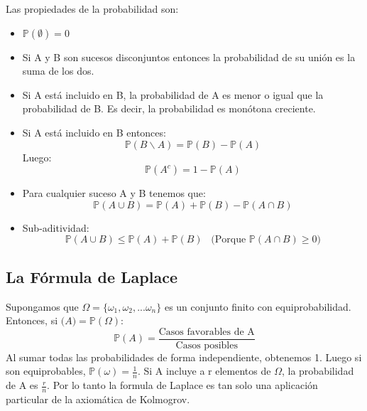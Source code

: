 \documentclass[11pt]{article}
\newcommand{\prob}{\mathbb{P}}
\theoremstyle{plain}
\begin{document}
                Las propiedades de la probabilidad son:
                \begin{itemize}
                    \item $\prob(\emptyset) = 0$
                    \item Si A y B son sucesos disconjuntos entonces la probabilidad de su unión es la suma de los dos.
                    \item Si A está incluido en B, la probabilidad de A es menor o igual que la probabilidad de B. Es decir, la probabilidad es monótona creciente.
                    \item Si A está incluido en B entonces:
                    \begin{equation}
                         \mathbb{P}(B \backslash A) = \mathbb{P}(B) - \mathbb{P}(A)
                     \end{equation}
                     Luego:
                     \begin{equation}\label{eq:8}
                         \mathbb{P}(A^c) = 1 - \mathbb{P}(A)
                     \end{equation}
                    \item Para cualquier suceso A y B tenemos que:
                    \begin{equation}
                         \mathbb{P}(A \cup B) = \mathbb{P}(A) + \mathbb{P}(B) - \mathbb{P} (A \cap B)
                    \end{equation}
                    \item Sub-aditividad:
                    \begin{equation}
                        \mathbb{P}(A \cup B) \le \mathbb{P}(A) + \mathbb{P}(B) \;\;\; \text{(Porque $\mathbb{P}(A\cap B) \ge 0$)}
                    \end{equation}
                \end{itemize}
            \subsection{La Fórmula de Laplace} %
            \label{sub:la_fórmula_de_laplace}
                Supongamos que $\varOmega = \{\omega_1,\omega_2,...\omega_{n}\}$ es un conjunto finito con equiprobabilidad. Entonces, si $\mathcal(A) = \mathbb{P}(\varOmega)$:
                \begin{equation}
                    \mathbb{P}(A) = \frac{\text{Casos favorables de A}}{\text{Casos posibles}}
                \end{equation}
                Al sumar todas las probabilidades de forma independiente, obtenemos 1. Luego si son equiprobables, $\mathbb{P}(\omega) = \frac{1}{n}$. Si A incluye a r elementos de $\varOmega$, la probabilidad de A es $\frac{r}{n}$. Por lo tanto la formula de Laplace es tan solo una aplicación particular de la axiomática de Kolmogrov. 
\end{document}
